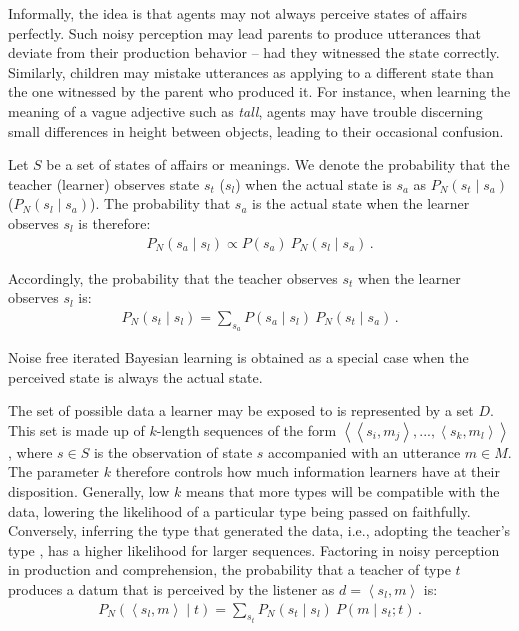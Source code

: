 \documentclass[10pt,a4paper]{article}
\newcommand{\tuple}[1]{\ensuremath{\left\langle #1 \right\rangle}}
\begin{document}
Informally, the idea is that agents may not always perceive states of affairs perfectly. Such noisy perception may lead parents to produce utterances that deviate from their production behavior -- had they witnessed the state correctly. Similarly, children may mistake utterances as applying to a different state than the one witnessed by the parent who produced it. For instance, when learning the meaning of a vague adjective such as {\em tall}, agents may have trouble discerning small differences in height between objects, leading to their occasional confusion.

Let $S$ be a set of states of affairs or meanings. We denote the probability that the teacher (learner) observes state $s_t$ ($s_l$) when the actual state is $s_a$ as $P_N(s_t \mid s_a)$ ($P_N(s_l \mid s_a)$). The probability that $s_a$ is the actual state when the learner observes $s_l$ is therefore:
\begin{align*}
  P_N(s_a \mid s_l) \propto P(s_a) \ P_N(s_l \mid s_a)\,.
\end{align*}

Accordingly, the probability that the teacher observes $s_t$ when the learner observes $s_l$ is:
\begin{align*}
  P_N(s_t \mid s_l) = \sum_{s_a} P(s_a \mid s_l) \ P_N(s_t \mid s_a)\,.
\end{align*}

Noise free iterated Bayesian learning is obtained as a special case when the perceived state is always the actual state. 

The set of possible data a learner may be exposed to is represented by a set $D$. This set is made up of $k$-length sequences of the form $\tuple{\tuple{s_i,m_j}, ..., \tuple{s_k,m_l}}$, where $s \in S$ is the observation of state $s$ accompanied with an utterance $m \in M$. The parameter $k$ therefore controls how much information learners have at their disposition. Generally, low $k$ means that more types will be compatible with the data, lowering the likelihood of a particular type being passed on faithfully. Conversely, inferring the type that generated the data, i.e., adopting the teacher's type , has a higher likelihood for larger sequences. Factoring in noisy perception in production and comprehension, the probability that a teacher of type $t$ produces a datum that is
perceived by the listener as $d = \tuple{s_l, m}$ is:
\begin{align*}
  P_N(\tuple{s_l, m} \mid t) = \sum_{s_t} P_N(s_t \mid s_l) \ P(m \mid s_t; t)\,.
\end{align*}
\end{document}
